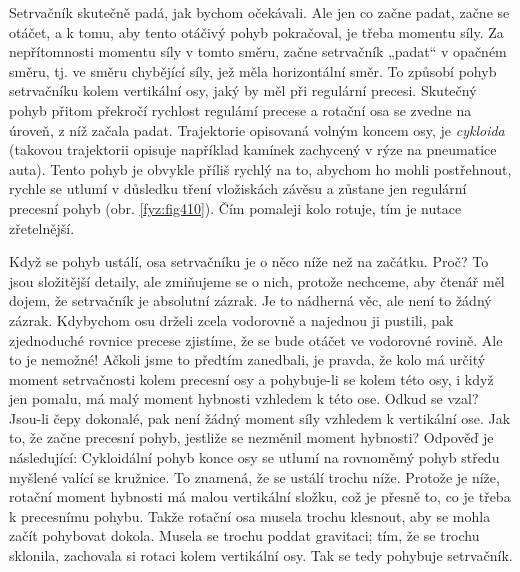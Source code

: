     Setrvačník skutečně padá, jak bychom očekávali. Ale jen co začne padat, začne se otáčet, a k
    tomu, aby tento otáčivý pohyb pokračoval, je třeba momentu síly. Za nepřítomnosti momentu síly v
    tomto směru, začne setrvačník „padat“ v opačném směru, tj. ve směru chybějící síly, jež měla
    horizontální směr. To způsobí pohyb setrvačníku kolem vertikální osy, jaký by měl při regulární
    precesi. Skutečný pohyb přitom překročí rychlost regulámí precese a rotační osa se zvedne na
    úroveň, z níž začala padat. Trajektorie opisovaná volným koncem osy, je \emph{cykloida} (takovou
    trajektorii opisuje například kamínek zachycený v rýze na pneumatice auta). Tento pohyb je
    obvykle příliš rychlý na to, abychom ho mohli postřehnout, rychle se utlumí v důsledku tření
    vložiskách závěsu a zůstane jen regulární precesní pohyb (obr. \ref{fyz:fig410}). Čím pomaleji
    kolo rotuje, tím je nutace zřetelnější.

    Když se pohyb ustálí, osa setrvačníku je o něco níže než na začátku. Proč? To jsou složitější
    detaily, ale zmiňujeme se o nich, protože nechceme, aby čtenář měl dojem, že setrvačník je
    absolutní zázrak. Je to nádherná věc, ale není to žádný zázrak. Kdybychom osu drželi zcela
    vodorovně a najednou ji pustili, pak zjednoduché rovnice precese zjistíme, že se bude otáčet ve
    vodorovné rovině. Ale to je nemožné! Ačkoli jsme to předtím zanedbali, je pravda, že kolo má
    určitý moment setrvačnosti kolem precesní osy a pohybuje-li se kolem této osy, i když jen
    pomalu, má malý moment hybnosti vzhledem k této ose. Odkud se vzal? Jsou-li čepy dokonalé, pak
    není žádný moment síly vzhledem k vertikální ose. Jak to, že začne precesní pohyb, jestliže se
    nezměnil moment hybnosti? Odpověď je následující: Cykloidální pohyb konce osy se utlumí na
    rovnoměmý pohyb středu myšlené valící se kružnice. To znamená, že se ustálí trochu níže. Protože
    je níže, rotační moment hybnosti má malou vertikální složku, což je přesně to, co je třeba k
    precesnímu pohybu. Takže rotační osa musela trochu klesnout, aby se mohla začít pohybovat
    dokola. Musela se trochu poddat gravitaci; tím, že se trochu sklonila, zachovala si rotaci kolem
    vertikální osy. Tak se tedy pohybuje setrvačník.

